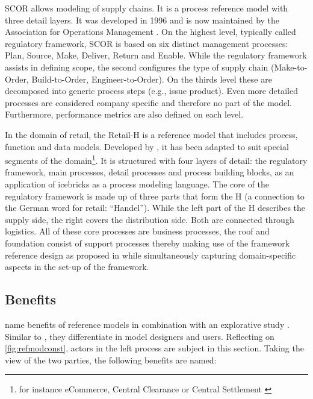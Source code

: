 		\acrshort{SCOR} allows modeling of supply chains. It is a process reference model with three detail layers. It was developed in 1996 and is now maintained by the Association for Operations Management \citep{APICS2015}. On the highest level, typically called regulatory framework, \acrshort{SCOR}  is based on six distinct management processes: Plan, Source, Make, Deliver, Return and Enable. While the regulatory framework assists in defining scope, the second configures the type of supply chain (Make-to-Order, Build-to-Order, Engineer-to-Order). On the thirds level these are decomposed into generic process steps (e.g., issue product). Even more detailed processes are considered company specific and therefore no part of the model. Furthermore, performance metrics are also defined on each level. 
	
		\label{mod:retail}
		In the domain of retail, the Retail-H is a reference model that includes process, function and data models. Developed by \cite{becker2004handelsinformationssysteme}, it has been adapted to suit special segments of the domain\footnote{for instance eCommerce, Central Clearance or Central Settlement \citep{Puster2015}}. 
		It is structured with four layers of detail: the regulatory framework, main processes, detail processes and process building blocks, as an application of icebricks as a process modeling language. The core of the regulatory framework is made up of three parts that form the H (a connection to the German word for retail: \enquote{Handel}). While the left part of the H describes the supply side, the right covers the distribution side. Both are connected through logistics. All of these core processes are business processes, the roof and foundation consist of support processes thereby making use of the framework reference design as proposed in \cite{Meise2001} while simultaneously capturing domain-specific aspects in the set-up of the framework.  
		
	
		


		\subsection{Benefits}
		
		\citeauthor{becker2004handelsinformationssysteme} name benefits of reference models in combination with an explorative study \citep[]{Schutte1998}. Similar to \cite{vom2006reusable}, they differentiate in model designers and users. Reflecting on \Fig \ref{fig:refmodconst}, actors in the left process are subject in this section. Taking the view of the two parties, the following benefits are named:
		
